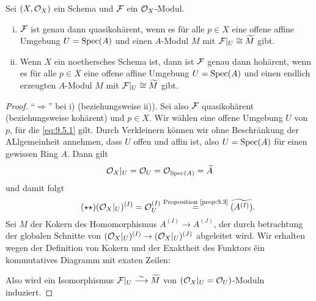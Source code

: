 \begin{prop}
\label{prop:9.6}
	Sei $(X,\mathcal{O}_X)$ ein Schema und $\mathcal{F}$ ein $\mathcal{O}_X$-Modul.
	\begin{enumerate}[i)]
		\item $\mathcal{F}$ ist genau dann quasikohärent, wenn es für alle $p\in X$ eine offene affine Umgebung $U=\operatorname{Spec}(A)$ und einen $A$-Modul $M$ mit $\mathcal{F}\vert_U \cong \widetilde{M}$ gibt.
		\item Wenn $X$ ein noethersches Schema ist, dann ist $\mathcal{F}$ genau dann hohärent, wenn es für alle $p\in X$ eine offene affine Umgebung $U=\operatorname{Spec}(A)$ und einen endlich erzeugten $A$-Modul $M$ mit $\mathcal{F}\vert_U \cong \widetilde{M}$ gibt.
	\end{enumerate}
	\begin{proof}
		\enquote{$\Longrightarrow$} bei i) (beziehungsweise ii)). Sei also $\mathcal{F}$ quasikohärent (beziehungsweise kohärent) und $p\in X$. Wir wählen eine offene Umgebung $U$ von $p$, für die \eqref{eq:9.5.1} gilt. Durch Verkleinern können wir ohne Beschränkung der ALlgemeinheit annehmen, dass $U$ offen und affin ist, also $U= \operatorname{Spec}(A)$ für einen gewissen Ring $A$. Dann gilt
		\[
			\mathcal{O}_X\vert_U = \mathcal{O}_U = \mathcal{O}_{\operatorname{Spec}(A)} = \widetilde{A}
		\]
		und damit folgt
		\begin{equation*}
		\label{eq:9.6.1}\tag{$\star\star$}
			(\mathcal{O}_X\vert_U)^{(I)} = \mathcal{O}_U^{(I)} \overset{\text{Proposition~\ref{prop:9.3}}}{=} \widetilde{(A^{(I)})}.
		\end{equation*}
		Sei $M$ der Kokern des Homomorphismus $A^{(I)}\to A^{(J)}$, der durch betrachtung der globalen Schnitte von $(\mathcal{O}_X\vert_U)^{(I)}\to (\mathcal{O}_X\vert_U)^{(J)}$ abgeleitet wird. Wir erhalten wegen der Definition von Kokern und der Exaktheit des Funktors \~ ein kommutatives Diagramm mit exaten Zeilen:
		\begin{center}
		\end{center}
		Also wird ein Isomorphismus $\mathcal{F}\vert_U \overset{\sim}{\longrightarrow} \widetilde{M}$ von $(\mathcal{O}_X\vert_U = \mathcal{O}_U)$-Moduln induziert.


\end{proof}
\end{prop}
